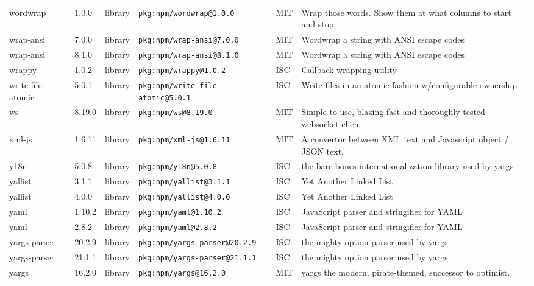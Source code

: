 \documentclass[11pt,a4paper]{article}
\begin{document}
\begin{longtable}{|p{4cm}|p{2cm}|p{1.6cm}|p{5cm}|p{1.5cm}|p{3.5cm}|}
\raggedright wordwrap & 1.0.0 & library & \small\texttt{pkg:npm/wordwrap@1.0.0} & MIT & \small Wrap those words. Show them at what columns to start and stop. \\
\raggedright wrap-ansi & 7.0.0 & library & \small\texttt{pkg:npm/wrap-ansi@7.0.0} & MIT & \small Wordwrap a string with ANSI escape codes \\
\raggedright wrap-ansi & 8.1.0 & library & \small\texttt{pkg:npm/wrap-ansi@8.1.0} & MIT & \small Wordwrap a string with ANSI escape codes \\
\raggedright wrappy & 1.0.2 & library & \small\texttt{pkg:npm/wrappy@1.0.2} & ISC & \small Callback wrapping utility \\
\raggedright write-file-atomic & 5.0.1 & library & \small\texttt{pkg:npm/write-file-atomic@5.0.1} & ISC & \small Write files in an atomic fashion w/configurable ownership \\
\raggedright ws & 8.19.0 & library & \small\texttt{pkg:npm/ws@8.19.0} & MIT & \small Simple to use, blazing fast and thoroughly tested websocket clien \\
\raggedright xml-js & 1.6.11 & library & \small\texttt{pkg:npm/xml-js@1.6.11} & MIT & \small A convertor between XML text and Javascript object / JSON text. \\
\raggedright y18n & 5.0.8 & library & \small\texttt{pkg:npm/y18n@5.0.8} & ISC & \small the bare-bones internationalization library used by yargs \\
\raggedright yallist & 3.1.1 & library & \small\texttt{pkg:npm/yallist@3.1.1} & ISC & \small Yet Another Linked List \\
\raggedright yallist & 4.0.0 & library & \small\texttt{pkg:npm/yallist@4.0.0} & ISC & \small Yet Another Linked List \\
\raggedright yaml & 1.10.2 & library & \small\texttt{pkg:npm/yaml@1.10.2} & ISC & \small JavaScript parser and stringifier for YAML \\
\raggedright yaml & 2.8.2 & library & \small\texttt{pkg:npm/yaml@2.8.2} & ISC & \small JavaScript parser and stringifier for YAML \\
\raggedright yargs-parser & 20.2.9 & library & \small\texttt{pkg:npm/yargs-parser@20.2.9} & ISC & \small the mighty option parser used by yargs \\
\raggedright yargs-parser & 21.1.1 & library & \small\texttt{pkg:npm/yargs-parser@21.1.1} & ISC & \small the mighty option parser used by yargs \\
\raggedright yargs & 16.2.0 & library & \small\texttt{pkg:npm/yargs@16.2.0} & MIT & \small yargs the modern, pirate-themed, successor to optimist. \\

\end{longtable}
\end{document}
